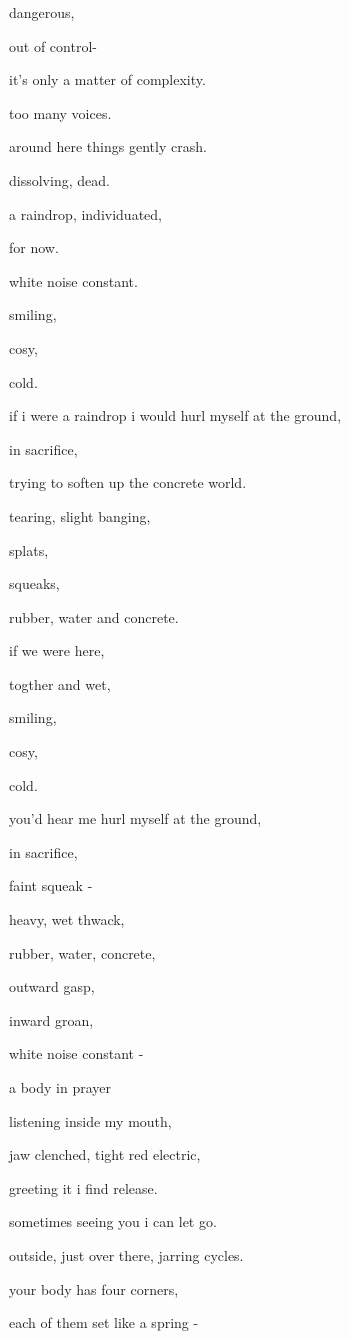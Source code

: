 \documentclass{article}
\begin{document}
	dangerous,

	out of control-

	it's only a matter of complexity.

	too many voices.\newpage

	around here things gently crash.

	dissolving, dead.

	a raindrop, individuated, 

	for now.\newpage

	white noise constant.

	smiling, 

	cosy,

	cold.\newpage

	if i were a raindrop i would hurl myself at the ground,

	in sacrifice,

	trying to soften up the concrete world.\newpage

	tearing, slight banging,

	splats,

	squeaks,

	rubber, water and concrete.\newpage

	if we were here,

	togther and wet,

	smiling,

	cosy,

	cold.\newpage

	you'd hear me hurl myself at the ground,

	in sacrifice,

	faint squeak -

	heavy, wet thwack,

	rubber, water, concrete,

	outward gasp,

	inward groan,\newpage

	white noise constant -

	a body in prayer
	\newpage

	listening inside my mouth,

	jaw clenched, tight red electric,

	greeting it i find release.\newpage

	sometimes seeing you i can let go.\newpage

	outside, just over there, jarring cycles.

	your body has four corners,

	each of them set like a spring -
\end{document}
